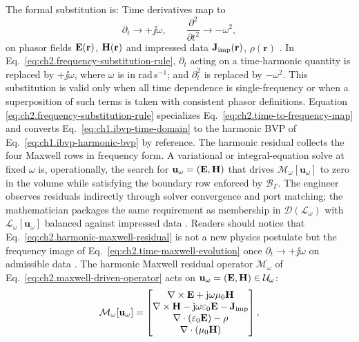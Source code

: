 The formal substitution is:
Time derivatives map to
\begin{equation}
\label{eq:ch2.frequency-substitution-rule}
\partial_t \longrightarrow +\jj\omega,
\qquad
\frac{\partial^2}{\partial t^2}\longrightarrow -\omega^2,
\end{equation}
on phasor fields \(\mathbf{E}(\mathbf{r})\), \(\mathbf{H}(\mathbf{r})\) and impressed data
\(\mathbf{J}_{\mathrm{imp}}(\mathbf{r})\), \(\rho(\mathbf{r})\) \cite{stratton1941}.
In Eq.~\eqref{eq:ch2.frequency-substitution-rule},
\(\partial_t\) acting on a time-harmonic quantity is replaced by \(+\jj\omega\),
where \(\omega\) is in rad\,s\(^{-1}\); and \(\partial_t^{2}\) is replaced by
\(-\omega^{2}\).
This substitution is valid only when all time dependence is single-frequency or when
a superposition of such terms is taken with consistent phasor definitions.
Equation
\eqref{eq:ch2.frequency-substitution-rule} specializes
Eq.~\eqref{eq:ch2.time-to-frequency-map} and converts
Eq.~\eqref{eq:ch1.ibvp-time-domain} to the harmonic BVP of
Eq.~\eqref{eq:ch1.ibvp-harmonic-bvp} by reference.
The harmonic residual collects the four Maxwell rows in frequency form.
A variational or integral-equation solve at fixed $\omega$ is, operationally, the search
for $\mathbf{u}_\omega=(\mathbf{E},\mathbf{H})$ that drives $\mathcal{M}_\omega[\mathbf{u}_\omega]$ to zero
in the volume while satisfying the boundary row enforced by $\mathcal{B}_\Gamma$.
The engineer observes residuals indirectly through solver convergence and port matching;
the mathematician packages the same requirement as membership in
$\mathcal{D}(\mathcal{L}_\omega)$ with $\mathcal{L}_\omega[\mathbf{u}_\omega]$ balanced
against impressed data \cite{harrington2001}. Readers should notice that
Eq.~\eqref{eq:ch2.harmonic-maxwell-residual} is not a new physics postulate but the
frequency image of Eq.~\eqref{eq:ch2.time-maxwell-evolution} once $\partial_t\to+\jj\omega$
on admissible data \cite{stratton1941}. The harmonic Maxwell residual
operator \(\mathcal{M}_\omega\) of Eq.~\eqref{eq:ch2.maxwell-driven-operator}
acts on \(\mathbf{u}_\omega=(\mathbf{E},\mathbf{H})\in\mathcal{U}_\omega\):
\begin{equation}
\label{eq:ch2.harmonic-maxwell-residual}
\mathcal{M}_\omega[\mathbf{u}_\omega]
=
\begin{bmatrix}
\nabla\times\mathbf{E}+\mathrm{j}\omega\mu_0\mathbf{H}\\
\nabla\times\mathbf{H}-\mathrm{j}\omega\varepsilon_0\mathbf{E}-\mathbf{J}_{\mathrm{imp}}\\
\nabla\cdot(\varepsilon_0\mathbf{E})-\rho\\
\nabla\cdot(\mu_0\mathbf{H})
\end{bmatrix},
\end{equation}
